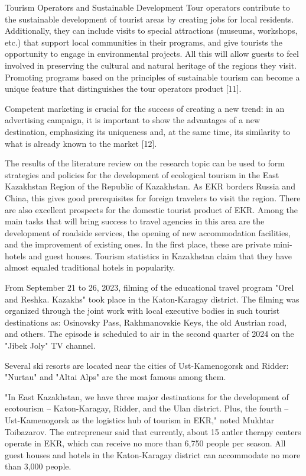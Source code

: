 \begin{multicols}{2}
Tourism Operators and Sustainable Development Tour operators contribute
to the sustainable development of tourist areas by creating jobs for
local residents. Additionally, they can include visits to special
attractions (museums, workshops, etc.) that support local communities in
their programs, and give tourists the opportunity to engage in
environmental projects. All this will allow guests to feel involved in
preserving the cultural and natural heritage of the regions they visit.
Promoting programs based on the principles of sustainable tourism can
become a unique feature that distinguishes the tour
operator\textquotesingle s product {[}11{]}.

Competent marketing is crucial for the success of creating a new trend:
in an advertising campaign, it is important to show the advantages of a
new destination, emphasizing its uniqueness and, at the same time, its
similarity to what is already known to the market {[}12{]}.

The results of the literature review on the research topic can be used
to form strategies and policies for the development of ecological
tourism in the East Kazakhstan Region of the Republic of Kazakhstan. As
EKR borders Russia and China, this gives good prerequisites for foreign
travelers to visit the region. There are also excellent prospects for
the domestic tourist product of EKR. Among the main tasks that will
bring success to travel agencies in this area are the development of
roadside services, the opening of new accommodation facilities, and the
improvement of existing ones. In the first place, these are private
mini-hotels and guest houses. Tourism statistics in Kazakhstan claim
that they have almost equaled traditional hotels in popularity.

From September 21 to 26, 2023, filming of the educational travel program
"Orel and Reshka. Kazakhs" took place in the Katon-Karagay district. The
filming was organized through the joint work with local executive bodies
in such tourist destinations as: Osinovsky Pass, Rakhmanovskie Keys, the
old Austrian road, and others. The episode is scheduled to air in the
second quarter of 2024 on the "Jibek Joly" TV channel.

Several ski resorts are located near the cities of Ust-Kamenogorsk and
Ridder: "Nurtau" and "Altai Alps" are the most famous among them.

"In East Kazakhstan, we have three major destinations for the
development of ecotourism -- Katon-Karagay, Ridder, and the Ulan
district. Plus, the fourth -- Ust-Kamenogorsk as the logistics hub of
tourism in EKR," noted Mukhtar Toibazarov. The entrepreneur said that
currently, about 15 antler therapy centers operate in EKR, which can
receive no more than 6,750 people per season. All guest houses and
hotels in the Katon-Karagay district can accommodate no more than 3,000
people.


\end{multicols}
